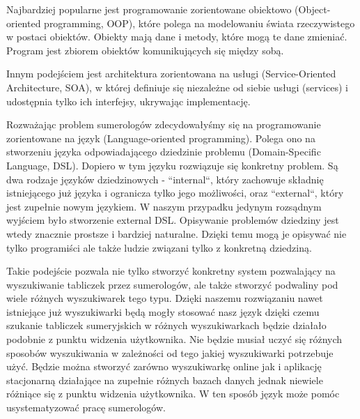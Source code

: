 Najbardziej popularne jest programowanie zorientowane obiektowo (Object-oriented programming, OOP), które polega na modelowaniu świata rzeczywistego w postaci obiektów. Obiekty mają dane i metody, które mogą te dane zmieniać. Program jest zbiorem obiektów komunikujących się między sobą. 

Innym podejściem jest architektura zorientowana na usługi (Service-Oriented Architecture, SOA), w której definiuje się niezależne od siebie usługi (services) i udostępnia tylko ich interfejsy, ukrywając implementację.

Rozważając problem sumerologów zdecydowałyśmy się na programowanie zorientowane na język (Language-oriented programming). Polega ono na stworzeniu języka odpowiadającego dziedzinie problemu (Domain-Specific Language, DSL). Dopiero w tym języku rozwiązuje się konkretny problem. Są dwa rodzaje języków dziedzinowych - ``internal``, który zachowuje składnię istniejącego już języka i ogranicza tylko jego możliwości, oraz ``external``, który jest zupełnie nowym językiem. W naszym przypadku jedynym rozsądnym wyjściem było stworzenie external DSL. Opisywanie problemów dziedziny jest wtedy znacznie prostsze i bardziej naturalne. Dzięki temu mogą je opisywać nie tylko programiści ale także ludzie związani tylko z konkretną dziedziną. 

Takie podejście pozwala nie tylko stworzyć konkretny system pozwalający na wyszukiwanie tabliczek przez sumerologów, ale także stworzyć podwaliny pod wiele różnych wyszukiwarek tego typu. Dzięki naszemu rozwiązaniu nawet istniejące już wyszukiwarki będą mogły stosować nasz język dzięki czemu szukanie tabliczek sumeryjskich w różnych wyszukiwarkach będzie działało podobnie z punktu widzenia użytkownika. Nie będzie musiał uczyć się różnych sposobów wyszukiwania w zależności od tego jakiej wyszukiwarki potrzebuje użyć. Będzie można stworzyć zarówno wyszukiwarkę online jak i aplikację stacjonarną działające na zupełnie różnych bazach danych jednak niewiele różniące się z punktu widzenia użytkownika. W ten sposób język może pomóc usystematyzować pracę sumerologów.



